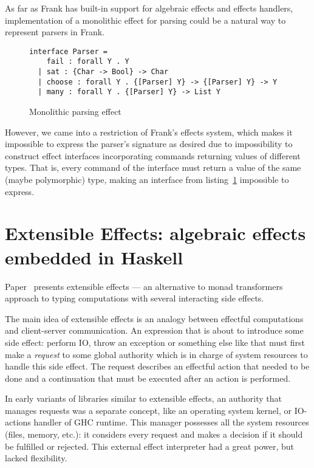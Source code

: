     As far as Frank has built-in support for algebraic effects and effects handlers,
    implementation of a monolithic effect for parsing could be a natural way to
    represent parsers in Frank.

    \begin{figure}[h]
    \begin{lstlisting}
interface Parser =
    fail : forall Y . Y
  | sat : {Char -> Bool} -> Char
  | choose : forall Y . {[Parser] Y} -> {[Parser] Y} -> Y
  | many : forall Y . {[Parser] Y} -> List Y
    \end{lstlisting}
    \caption{Monolithic parsing effect}
    \label{listing:parserEffMono}
    \end{figure}

    However, we came into a restriction of Frank's
    effects system, which makes it impossible to express the parser's signature
    as desired due to impossibility to construct effect interfaces incorporating
    commands returning values of different types. That is, every command of the interface must
    return a value of the same (maybe polymorphic) type, making an interface from
    listing~\ref{listing:parserEffMono} impossible to express.

    \section{Extensible Effects: algebraic effects embedded in Haskell}
    \label{cpt-alg-eff:ext-effects}

    Paper~\cite{Kiselyov:2013:EEA:2578854.2503791} presents extensible effects ---
    an alternative to monad transformers
    approach to typing computations with several interacting side effects.

    The main idea of extensible effects is an analogy between effectful computations and
    client-server communication. An expression that is about to introduce some side effect:
    perform IO, throw an exception or something else like that must first make a \emph{request}
    to some global authority which is in charge of system resources to handle this side effect.
    The request describes an effectful action that needed to be done and a continuation that
    must be executed after an action is performed.

    In early variants of libraries similar to extensible effects, an authority that manages
    requests was a separate concept, like an operating system kernel, or IO-actions
    handler of GHC runtime. This manager possesses all the system resources (files,
    memory, etc.): it considers every request and makes a decision if it should be
    fulfilled or rejected. This external effect interpreter had a great power, but lacked
    flexibility.


